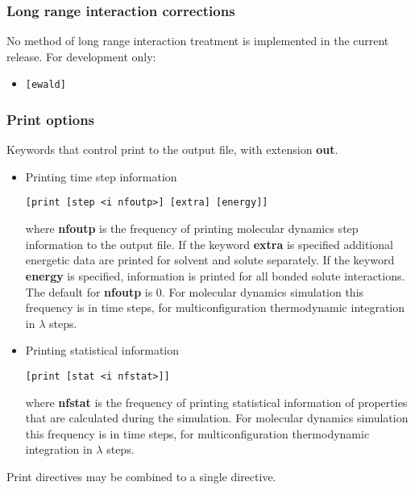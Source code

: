 \subsubsection{Long range interaction corrections}
No method of long range interaction treatment is implemented in the
current release. For development only:
\begin{itemize}
\item
\begin{verbatim}
[ewald]
\end{verbatim}
\end{itemize}
\subsubsection{Print options}
Keywords that control print to the output file, with extension {\bf out}.
\begin{itemize}
\item
Printing time step information
\begin{verbatim}
[print [step <i nfoutp>] [extra] [energy]]
\end{verbatim}
where {\bf nfoutp} is the frequency of printing molecular dynamics step
information to the output file. If the keyword {\bf extra} is specified
additional energetic data are printed for solvent and solute separately.
If the keyword {\bf energy} is specified, information is printed for
all bonded solute interactions.
The default for {\bf nfoutp} is 0. For molecular dynamics simulation
this frequency is in time steps, for multiconfiguration thermodynamic
integration in $\lambda$ steps.
\item
Printing statistical information
\begin{verbatim}
[print [stat <i nfstat>]]
\end{verbatim}
where {\bf nfstat} is the frequency of printing statistical information
of properties that are calculated during the simulation. 
For molecular dynamics simulation
this frequency is in time steps, for multiconfiguration thermodynamic
integration in $\lambda$ steps.
\end{itemize}
Print directives may be combined to a single directive.

